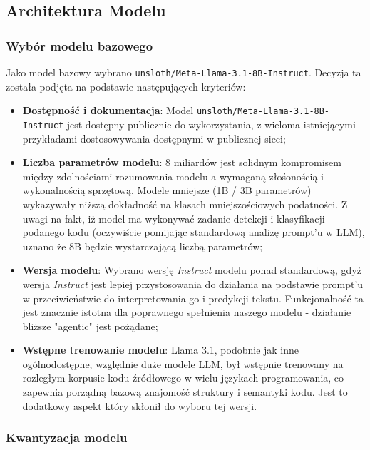 \documentclass[12pt,a4paper]{article}
\begin{document}
\subsection{Architektura Modelu}


\subsubsection{Wybór modelu bazowego}

Jako model bazowy wybrano \texttt{unsloth/Meta-Llama-3.1-8B-Instruct}. Decyzja ta została podjęta na podstawie następujących
kryteriów:

\begin{itemize}
    \item \textbf{Dostępność i dokumentacja}: Model \texttt{unsloth/Meta-Llama-3.1-8B-Instruct} jest dostępny publicznie do wykorzystania, z wieloma istniejącymi przykładami
            dostosowywania dostępnymi w publicznej sieci;
    
    \item \textbf{Liczba parametrów modelu}: 8 miliardów jest solidnym kompromisem między zdolnościami rozumowania modelu a wymaganą złośonością i wykonalnością sprzętową. 
    Modele mniejsze (1B / 3B parametrów) wykazywały niższą dokładność na klasach mniejszościowych podatności.
    Z uwagi na fakt, iż model ma wykonywać zadanie detekcji i klasyfikacji podanego kodu (oczywiście pomijając standardową analizę prompt'u w LLM), 
    uznano że 8B będzie wystarczającą liczbą parametrów; 

    \item \textbf{Wersja modelu}: Wybrano wersję \emph{Instruct} modelu ponad standardową, gdyż wersja \emph{Instruct} jest lepiej przystosowania do działania na 
            podstawie prompt'u w przeciwieństwie do interpretowania go i predykcji tekstu. Funkcjonalność ta jest znacznie istotna dla poprawnego spełnienia naszego
            modelu - działanie bliższe "agentic" jest pożądane;  

    \item \textbf{Wstępne trenowanie modelu}: Llama 3.1, podobnie jak inne ogólnodostępne, względnie duże modele LLM, był wstępnie trenowany na rozległym korpusie kodu
    źródłowego w wielu językach programowania, co zapewnia porządną bazową znajomość struktury i semantyki kodu. Jest to dodatkowy aspekt który skłonił do wyboru tej wersji.

\end{itemize}

\subsubsection{Kwantyzacja modelu}
\label{sssec:model_quantization}
\end{document}
